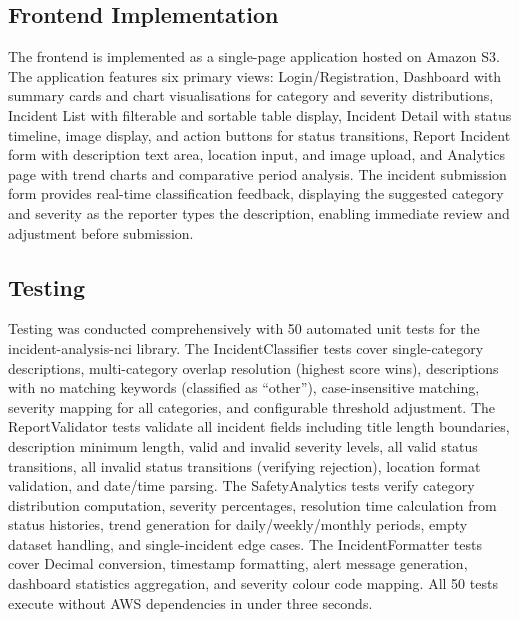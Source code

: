 \documentclass[conference]{IEEEtran}
\begin{document}
\subsection{Frontend Implementation}

The frontend is implemented as a single-page application hosted on Amazon S3. The application features six primary views: Login/Registration, Dashboard with summary cards and chart visualisations for category and severity distributions, Incident List with filterable and sortable table display, Incident Detail with status timeline, image display, and action buttons for status transitions, Report Incident form with description text area, location input, and image upload, and Analytics page with trend charts and comparative period analysis. The incident submission form provides real-time classification feedback, displaying the suggested category and severity as the reporter types the description, enabling immediate review and adjustment before submission.

\subsection{Testing}

Testing was conducted comprehensively with 50 automated unit tests for the incident-analysis-nci library. The IncidentClassifier tests cover single-category descriptions, multi-category overlap resolution (highest score wins), descriptions with no matching keywords (classified as ``other''), case-insensitive matching, severity mapping for all categories, and configurable threshold adjustment. The ReportValidator tests validate all incident fields including title length boundaries, description minimum length, valid and invalid severity levels, all valid status transitions, all invalid status transitions (verifying rejection), location format validation, and date/time parsing. The SafetyAnalytics tests verify category distribution computation, severity percentages, resolution time calculation from status histories, trend generation for daily/weekly/monthly periods, empty dataset handling, and single-incident edge cases. The IncidentFormatter tests cover Decimal conversion, timestamp formatting, alert message generation, dashboard statistics aggregation, and severity colour code mapping. All 50 tests execute without AWS dependencies in under three seconds.

\end{document}
